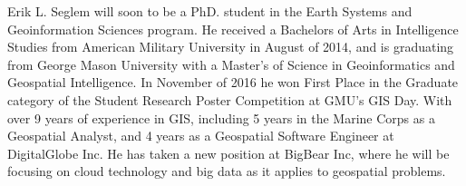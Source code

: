 \documentclass[11 pt]{report}
\begin{document}



\appendix
\appendixeqnumbering






\cvpage

\noindent
Erik L. Seglem will soon to be a PhD. student in the Earth Systems and Geoinformation Sciences program. He received a Bachelors of Arts in Intelligence Studies from American Military University in August of 2014, and is graduating from George Mason University with a Master’s of Science in Geoinformatics and Geospatial Intelligence.  In November of 2016 he won First Place in the Graduate category of the Student Research Poster Competition at GMU’s GIS Day. With over 9 years of experience in GIS, including 5 years in the Marine Corps as a Geospatial Analyst, and 4 years as a Geospatial Software Engineer at DigitalGlobe Inc. He has taken a new position at BigBear Inc, where he will be focusing on cloud technology and big data as it applies to geospatial problems.
\end{document}
